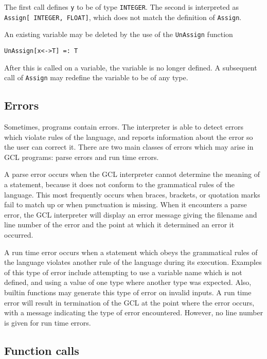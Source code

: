 \noindent The first call defines {\tt y} to be of type {\tt INTEGER}.  The
second is interpreted as {\tt Assign[ INTEGER, FLOAT]}, which does
not match the definition of {\tt Assign}.

An existing variable may be deleted by the use of the {\tt UnAssign} function

\begin{verbatim}
UnAssign[x<->T] =: T
\end{verbatim}

\noindent After this is called on a variable, the variable is no longer
defined.  A subsequent call of {\tt Assign} may redefine the variable to
be of any type.

\subsection{Errors}

Sometimes, programs contain errors.  The interpreter is able to detect
errors which violate rules of the language, and reports information
about the error so the user can correct it.  There are two main
classes of errors which may arise in GCL programs: parse errors and
run time errors.

A parse error occurs when the GCL interpreter cannot determine the
meaning of a statement, because it does not conform to the grammatical
rules of the language.  This most frequently occurs when braces,
brackets, or quotation marks fail to match up or when punctuation is
missing.  When it encounters a parse error, the GCL interpreter will
display an error message giving the filename and line number of the
error and the point at which it determined an error it occurred.

A run time error occurs when a statement which obeys the grammatical
rules of the language violates another rule of the language during its
execution.  Examples of this type of error include attempting to use a
variable name which is not defined, and using a value of one type
where another type was expected.  Also, builtin functions may generate
this type of error on invalid inputs.  A run time error will result in
termination of the GCL at the point where the error occurs, with a
message indicating the type of error encountered.  However, no line
number is given for run time errors.  

\subsection{Function calls}

